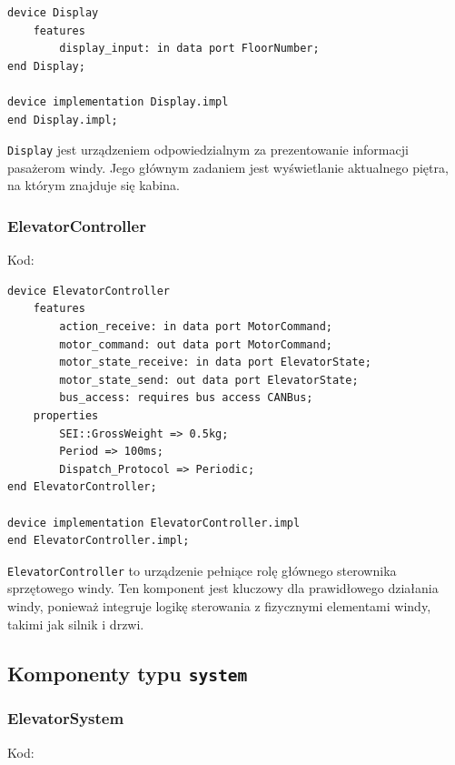 \documentclass{article}
\begin{document}
    \begin{lstlisting}[basicstyle=\ttfamily, keywordstyle=\bfseries]
device Display
    features
        display_input: in data port FloorNumber; 
end Display;

device implementation Display.impl
end Display.impl;
    \end{lstlisting}

    \texttt{Display} jest urządzeniem odpowiedzialnym za prezentowanie informacji pasażerom windy. Jego głównym zadaniem jest wyświetlanie aktualnego piętra, na którym znajduje się kabina. 


    \subsubsection{ElevatorController}

    Kod:
    
    \begin{lstlisting}[basicstyle=\ttfamily, keywordstyle=\bfseries]
device ElevatorController
    features
        action_receive: in data port MotorCommand;
        motor_command: out data port MotorCommand;
        motor_state_receive: in data port ElevatorState;
        motor_state_send: out data port ElevatorState;
        bus_access: requires bus access CANBus;
    properties
        SEI::GrossWeight => 0.5kg;
        Period => 100ms;
        Dispatch_Protocol => Periodic;
end ElevatorController;

device implementation ElevatorController.impl
end ElevatorController.impl;
    \end{lstlisting}

    \texttt{ElevatorController}  to urządzenie pełniące rolę głównego sterownika sprzętowego windy. Ten komponent jest kluczowy dla prawidłowego działania windy, ponieważ integruje logikę sterowania z fizycznymi elementami windy, takimi jak silnik i drzwi.




    \subsection{Komponenty typu \texttt{system}}

    
    \subsubsection{ElevatorSystem}

    Kod:
    
\end{document}
